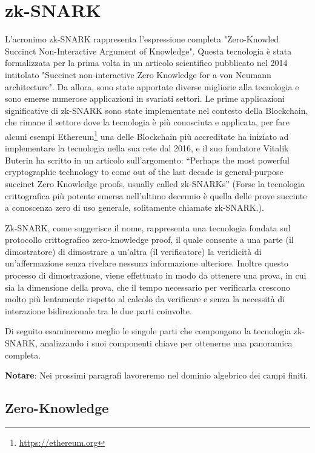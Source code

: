 \section{zk-SNARK}

L'acronimo zk-SNARK rappresenta l'espressione completa "Zero-Knowled Succinct Non-Interactive Argument of Knowledge".
Questa tecnologia è stata formalizzata per la prima volta in un articolo scientifico pubblicato nel 2014 intitolato
"Succinct non-interactive Zero Knowledge for a von Neumann architecture"\cite{10.5555/2671225.2671275}. Da allora, sono state apportate diverse migliorie alla tecnologia
e sono emerse numerose applicazioni in svariati settori. Le prime applicazioni significative di zk-SNARK sono state
implementate nel contesto della Blockchain, che rimane il settore dove la tecnologia è più conosciuta e applicata, per
fare alcuni esempi Ethereum\footnote{\url{https://ethereum.org}} una delle Blockchain più accreditate  ha iniziato ad implementare la tecnologia nella sua
rete dal 2016, e il suo fondatore Vitalik Buterin ha scritto in un articolo sull’argomento: “Perhaps the most powerful
cryptographic technology to come out of the last decade is general-purpose succinct Zero Knowledge proofs, usually
called zk-SNARKs” \cite{how-zk-snarks-are-possible} (Forse la tecnologia crittografica più potente emersa nell'ultimo decennio è quella delle prove
succinte a conoscenza zero di uso generale, solitamente chiamate zk-SNARK.).

Zk-SNARK, come suggerisce il nome, rappresenta una tecnologia fondata sul protocollo crittografico zero-knowledge proof,
il quale consente a una parte (il dimostratore) di dimostrare a un'altra (il verificatore) la veridicità di
un'affermazione senza rivelare nessuna informazione ulteriore. Inoltre questo processo di dimostrazione, viene
effettuato in modo da ottenere una prova, in cui sia la dimensione della prova, che il tempo necessario per verificarla
crescono molto più lentamente rispetto al calcolo da verificare e senza la necessità di interazione bidirezionale tra le
due parti coinvolte.

Di seguito esamineremo meglio le singole parti che compongono la tecnologia zk-SNARK, analizzando i suoi componenti
chiave per ottenerne una panoramica completa.

\textbf{Notare}: Nei prossimi paragrafi lavoreremo nel dominio algebrico dei campi finiti.

\subsection{Zero-Knowledge}

